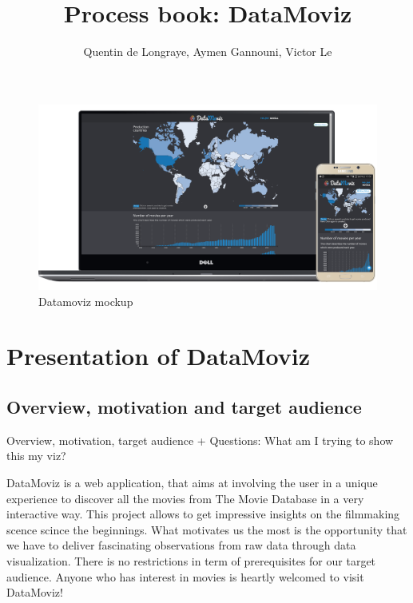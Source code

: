 \documentclass[a4paper,10pt]{article}
\begin{document}
\title{Process book: DataMoviz}
\author{Quentin de Longraye, Aymen Gannouni, Victor Le}

\maketitle

\begin{figure}[ht]
   \centering
   \includegraphics[width=1\linewidth]{../docs/mockup.png}
  \caption{Datamoviz mockup}
\end{figure}

\setlength{\parskip}{0.1\baselineskip}

\tableofcontents

\setlength{\parskip}{0.4\baselineskip}

\newpage

\section{Presentation of DataMoviz}

\subsection{Overview, motivation and target audience}
Overview, motivation, target audience
+ Questions: What am I trying to show this my viz?

DataMoviz is a web application, that aims at involving the user in a unique experience to discover all the movies from The Movie Database in a very interactive way. This project allows to get impressive insights on the filmmaking scence scince the beginnings.
What motivates us the most is the opportunity that we have to deliver fascinating observations from raw data through data visualization.
There is no restrictions in term of prerequisites for our target audience. Anyone who has interest in movies is heartly welcomed to visit DataMoviz!
\end{document}
